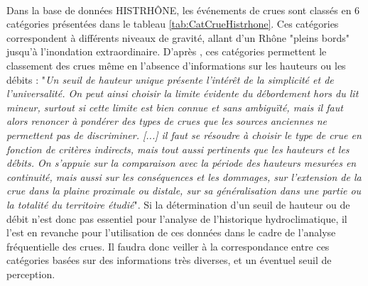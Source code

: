 \documentclass[11pt]{article}
\begin{document}
	\paragraph{} Dans la base de données HISTRHÔNE, les événements de crues sont classés en 6 catégories présentées dans le tableau \ref{tab:CatCrueHistrhone}. Ces catégories correspondent à différents niveaux de gravité, allant d'un Rhône "pleins bords" jusqu'à l'inondation extraordinaire. D'après \citet{pichard_sept_2014}, ces catégories permettent le classement des crues même en l'absence d'informations sur les hauteurs ou les débits : "\textit{Un seuil de hauteur unique présente l'intérêt de la simplicité et de l'universalité. On peut ainsi choisir la limite évidente du débordement hors du lit mineur, surtout si cette limite est bien connue et sans ambiguïté, mais il faut alors renoncer à pondérer des types de crues que les sources anciennes ne permettent pas de discriminer. [...] il faut se résoudre à choisir le type de crue en fonction de critères indirects, mais tout aussi pertinents que les hauteurs et les débits. On s'appuie sur la comparaison avec la période des hauteurs mesurées en continuité, mais aussi sur les conséquences et les dommages, sur l'extension de la crue dans la plaine proximale ou distale, sur sa généralisation dans une partie ou la totalité du territoire étudié}". Si la détermination d'un seuil de hauteur ou de débit n'est donc pas essentiel pour l'analyse de l'historique hydroclimatique, il l'est en revanche pour l'utilisation de ces données dans le cadre de l'analyse fréquentielle des crues.  Il faudra donc veiller à la correspondance entre ces catégories basées sur des informations très diverses, et un éventuel seuil de perception.
	
\end{document}
